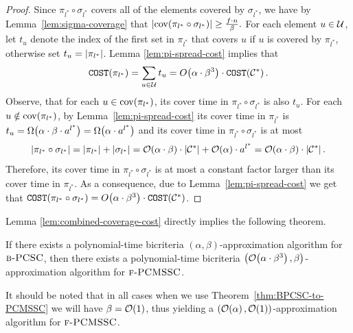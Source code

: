     \begin{proof}
        Since $\pi_{l^*} \circ \sigma_{l^*}$ covers all of the elements covered by $\sigma_{l^*}$, we have by Lemma~\ref{lem:sigma-coverage} that $
        \mathopen{}\left| \operatorname{cov}\mathopen{}\left( \pi_{l^*} \circ \sigma_{l^*} \right) \right|\geq \frac{f\cdot n}{\beta}.$
        For each element $u\in\mathcal{U}$, let $t_u$ denote the index of the first set in $\pi_{l^*}$ that covers $u$ if $u$ is covered by $\pi_{l^*}$, otherwise set $t_u=\mathopen{}\left| \pi_{l^*} \right|$.
        Lemma \ref{lem:pi-spread-cost} implies that 
        \[
        \texttt{COST}\mathopen{}\left( \pi_{l^*} \right)=\sum_{u\in\mathcal{U}} t_u = O\mathopen{}\left( \alpha\cdot\beta^3 \right)\cdot \texttt{COST}\mathopen{}\left( \mathcal{C}^{*} \right).
        \]
        Observe, that for each $u\in\operatorname{cov}\mathopen{}\left( \pi_{l^*} \right)$, its cover time in $\pi_{l^*} \circ \sigma_{l^*}$ is also $t_u$.
        For each $u\notin\operatorname{cov}\mathopen{}\left( \pi_{l^*} \right)$, by Lemma~\ref{lem:pi-spread-cost} its cover time in $\pi_{l^*}$ is $t_u=\Omega\mathopen{}\left(  \alpha\cdot\beta\cdot a^{l^*} \right)=\Omega\mathopen{}\left( \alpha\cdot a^{l^*} \right)$ and its cover time in $\pi_{l^*} \circ \sigma_{l^*}$ is at most 
        \[
        \mathopen{}\left| \pi_{l^*} \circ \sigma_{l^*} \right|=\mathopen{}\left| \pi_{l^*} \right| + \mathopen{}\left| \sigma_{l^*} \right| = \mathcal{O}\mathopen{}\left( \alpha\cdot\beta \right)\cdot \mathopen{}\left| \mathcal{C}^{*} \right| + \mathcal{O}\mathopen{}\left( \alpha \right)\cdot a^{l^*} = \mathcal{O}\mathopen{}\left( \alpha\cdot\beta \right)\cdot \mathopen{}\left| \mathcal{C}^{*} \right|.
        \]
        Therefore, its cover time in $\pi_{l^*} \circ \sigma_{l^*}$ is at most a constant factor larger than its cover time in $\pi_{l^*}$.
        As a consequence, due to Lemma~\ref{lem:pi-spread-cost} we get that $\texttt{COST}\mathopen{}\left( \pi_{l^*} \circ \sigma_{l^*} \right) = O\mathopen{}\left( \alpha\cdot\beta^3 \right)\cdot \texttt{COST}\mathopen{}\left( \mathcal{C}^{*} \right)$.
    \end{proof}
Lemma \ref{lem:combined-coverage-cost} directly implies the following theorem.
\begin{theorem}\label{thm:BPCSC-to-PCMSSC}
    If there exists a polynomial-time bicriteria $(\alpha,\beta)$-approximation algorithm for $\textup{\textsc{b-PCSC}}$, then there exists a polynomial-time bicriteria $\mathopen{}\left( \mathcal{O}\mathopen{}\left( \alpha\cdot\beta^3 \right), \beta \right)$-approximation algorithm for $\textup{\textsc{f-PCMSSC}}$.
\end{theorem}
It should be noted that in all cases when we use Theorem~\ref{thm:BPCSC-to-PCMSSC} we will have $\beta=\mathcal{O}\mathopen{}\left( 1 \right)$, thus yielding a $\mathopen{}\left( \mathcal{O}\mathopen{}\left( \alpha \right), \mathcal{O}\mathopen{}\left( 1 \right) \right)$-approximation algorithm for $\textup{\textsc{f-PCMSSC}}$.

